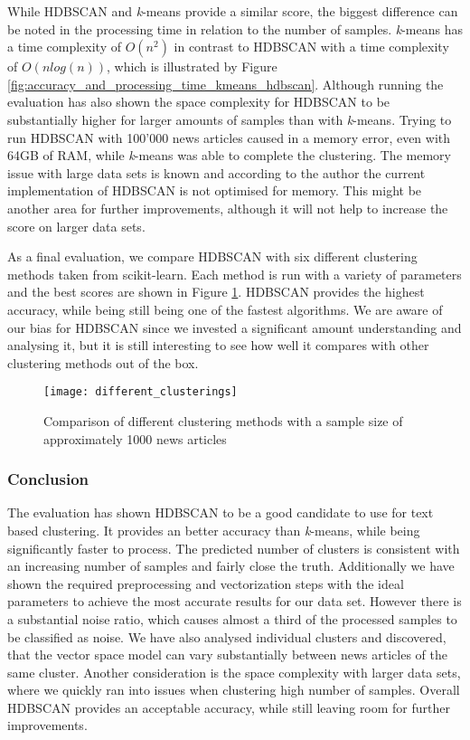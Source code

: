 While HDBSCAN and \textit{k}-means provide a similar score, the biggest difference can be noted in the processing time in relation to the number of samples. \textit{k}-means has a time complexity of $O(n^2)$ in contrast to HDBSCAN with a time complexity of $O(nlog(n))$, which is illustrated by Figure \ref{fig:accuracy_and_processing_time_kmeans_hdbscan}. Although running the evaluation has also shown the space complexity for HDBSCAN to be substantially higher for larger amounts of samples than with \textit{k}-means. Trying to run HDBSCAN with 100'000 news articles caused in a memory error, even with 64GB of RAM, while \textit{k}-means was able to complete the clustering. The memory issue with large data sets is known and according to the author the current implementation of HDBSCAN is not optimised for memory\cite{hdbscan_memory_issue}. This might be another area for further improvements, although it will not help to increase the score on larger data sets.

As a final evaluation, we compare HDBSCAN with six different clustering methods taken from scikit-learn. Each method is run with a variety of parameters and the best scores are shown in Figure \ref{fig:different_clusterings}. HDBSCAN provides the highest accuracy, while being still being one of the fastest algorithms. We are aware of our bias for HDBSCAN since we invested a significant amount understanding and analysing it, but it is still interesting to see how well it compares with other clustering methods out of the box.

\begin{figure}[h]
    \centering
    \texttt{[image: different\_clusterings]}
    \caption{Comparison of different clustering methods with a sample size of approximately 1000 news articles}
    \label{fig:different_clusterings}
\end{figure}

\subsubsection{Conclusion}

The evaluation has shown HDBSCAN to be a good candidate to use for text based clustering. It provides an better accuracy than \textit{k}-means, while being significantly faster to process. The predicted number of clusters is consistent with an increasing number of samples and fairly close the truth. Additionally we have shown the required preprocessing and vectorization steps with the ideal parameters to achieve the most accurate results for our data set. However there is a substantial noise ratio, which causes almost a third of the processed samples to be classified as noise. We have also analysed individual clusters and discovered, that the vector space model can vary substantially between news articles of the same cluster. Another consideration is the space complexity  with larger data sets, where we quickly ran into issues when clustering high number of samples. Overall HDBSCAN provides an acceptable accuracy, while still leaving room for further improvements.

